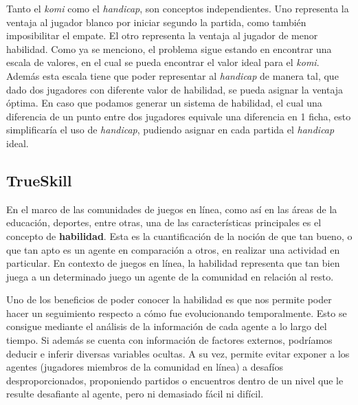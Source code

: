 \documentclass[11pt,twoside,spanish]{report} %
\begin{document}
Tanto el \textit{komi} como el \textit{handicap}, son conceptos independientes.
Uno representa la ventaja al jugador blanco por iniciar segundo la partida, como tambi\'en imposibilitar el empate.
El otro representa la ventaja al jugador de menor habilidad.
Como ya se menciono, el problema sigue estando en encontrar una escala de valores, en el cual se pueda encontrar el valor ideal para el \textit{komi}.
Adem\'as esta escala tiene que poder representar al \textit{handicap} de manera tal, que dado dos jugadores con diferente valor de habilidad, se pueda asignar la ventaja \'optima.
En caso que podamos generar un sistema de habilidad, el cual una diferencia de un punto entre dos jugadores equivale una diferencia en 1 ficha, esto simplificar\'ia el uso de \textit{handicap}, pudiendo asignar en cada partida el \textit{handicap} ideal.







\subsection{TrueSkill}
En el marco de las comunidades de juegos en l\'inea, como as\'i en las \'areas de la educaci\'on, deportes, entre otras, una de las caracter\'isticas principales es el concepto de \textbf{habilidad}.
Esta es la cuantificaci\'on de la noci\'on de que tan bueno, o que tan apto es un agente en comparaci\'on a otros, en realizar una actividad en particular.
En contexto de juegos en l\'inea, la habilidad representa que tan bien juega a un determinado juego un agente de la comunidad en relaci\'on al resto.

Uno de los beneficios de poder conocer la habilidad es que nos permite poder hacer un seguimiento respecto a c\'omo fue evolucionando temporalmente.
Esto se consigue mediante el an\'alisis de la informaci\'on de cada agente a lo largo del tiempo.
Si adem\'as se cuenta con informaci\'on de factores externos, podr\'iamos deducir e inferir diversas variables ocultas.
A su vez, permite evitar exponer a los agentes (jugadores miembros de la comunidad en l\'inea) a desaf\'ios desproporcionados, proponiendo partidos o encuentros dentro de un nivel que le resulte desafiante al agente, pero ni demasiado f\'acil ni dif\'icil.
\end{document}
